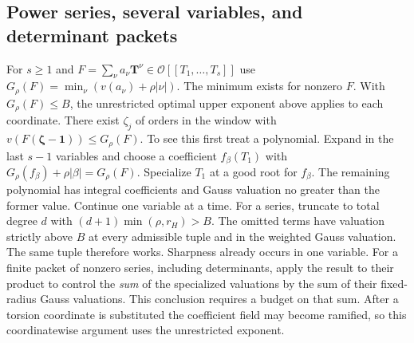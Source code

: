 \subsection{Power series, several variables, and determinant packets}
For $s\ge1$ and $F=\sum_{\nu}a_\nu\mathbf T^\nu\in\mathcal O[[T_1,\ldots,T_s]]$ use $G_\rho(F)=\min_\nu(v(a_\nu)+\rho|\nu|)$. The minimum exists for nonzero $F$. With $G_\rho(F)\le B$, the unrestricted optimal upper exponent above applies to each coordinate. There exist $\zeta_j$ of orders in the window with $v(F(\boldsymbol\zeta-\mathbf1))\le G_\rho(F)$. To see this first treat a polynomial. Expand in the last $s-1$ variables and choose a coefficient $f_\beta(T_1)$ with $G_\rho(f_\beta)+\rho|\beta|=G_\rho(F)$. Specialize $T_1$ at a good root for $f_\beta$. The remaining polynomial has integral coefficients and Gauss valuation no greater than the former value. Continue one variable at a time. For a series, truncate to total degree $d$ with $(d+1)\min(\rho,r_H)>B$. The omitted terms have valuation strictly above $B$ at every admissible tuple and in the weighted Gauss valuation. The same tuple therefore works. Sharpness already occurs in one variable. For a finite packet of nonzero series, including determinants, apply the result to their product to control the \emph{sum} of the specialized valuations by the sum of their fixed-radius Gauss valuations. This conclusion requires a budget on that sum. After a torsion coordinate is substituted the coefficient field may become ramified, so this coordinatewise argument uses the unrestricted exponent.
